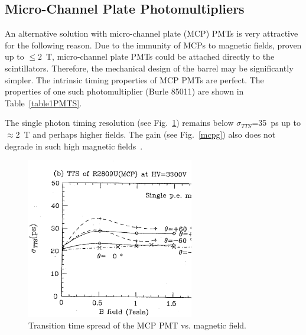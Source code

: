 
\subsection{Micro-Channel Plate Photomultipliers}

An alternative solution with micro-channel plate (MCP) PMTs is very attractive
for the following reason.  Due to the immunity of MCPs to magnetic fields, 
proven up to $\leq 2$~T\cite{kich}, micro-channel plate PMTs could be 
attached directly to the scintillators.  Therefore, the mechanical design of 
the barrel may be significantly simpler.  The intrinsic timing properties of 
MCP PMTs are perfect.  The properties of one such photomultiplier (Burle 
85011) are shown in Table~\ref{table1PMTS}.
  
The single photon timing resolution (see Fig.~\ref{mcpt}) remains below  
$\sigma_{TTS}$=35~ps up to $\approx$2~T and perhaps higher fields.  The 
gain (see Fig.~\ref{mcpg}) also does not degrade in such high magnetic 
fields~\cite{kich}.

\begin{figure}[htbp]
\centering
\includegraphics[width=0.65\textwidth]{fig02MC.ps}
\caption{\small{Transition time spread of the MCP PMT vs. magnetic field.}}
\label{mcpt}
\end{figure}

